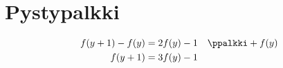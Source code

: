 \section{Pystypalkki}

\begin{align*}
f(y+1) - f(y) &= 2f(y) - 1 &\ppalkki +f(y) \\
f(y+1) &= 3f(y) - 1
\end{align*}

